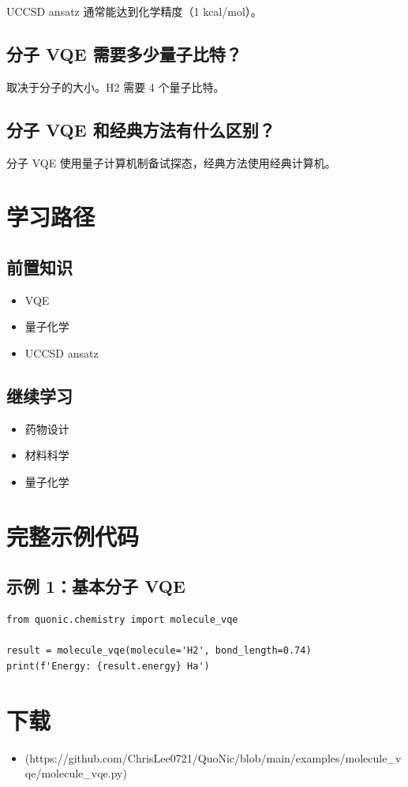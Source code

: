 \documentclass[12pt,a4paper]{article}
\begin{document}
UCCSD ansatz 通常能达到化学精度（1 kcal/mol）。

\subsection{分子 VQE 需要多少量子比特？}

取决于分子的大小。H2 需要 4 个量子比特。

\subsection{分子 VQE 和经典方法有什么区别？}

分子 VQE 使用量子计算机制备试探态，经典方法使用经典计算机。

\section{学习路径}

\subsection{前置知识}
\begin{itemize}
  \item VQE
  \item 量子化学
  \item UCCSD ansatz
\end{itemize}

\subsection{继续学习}
\begin{itemize}
  \item 药物设计
  \item 材料科学
  \item 量子化学
\end{itemize}

\section{完整示例代码}

\subsection{示例 1：基本分子 VQE}

\begin{verbatim}
from quonic.chemistry import molecule_vqe

result = molecule_vqe(molecule='H2', bond_length=0.74)
print(f'Energy: {result.energy} Ha')
\end{verbatim}

\section{下载}

\begin{itemize}
  \item [molecule\_vqe.py](https://github.com/ChrisLee0721/QuoNic/blob/main/examples/molecule_vqe/molecule_vqe.py)
\end{itemize}
\end{document}
